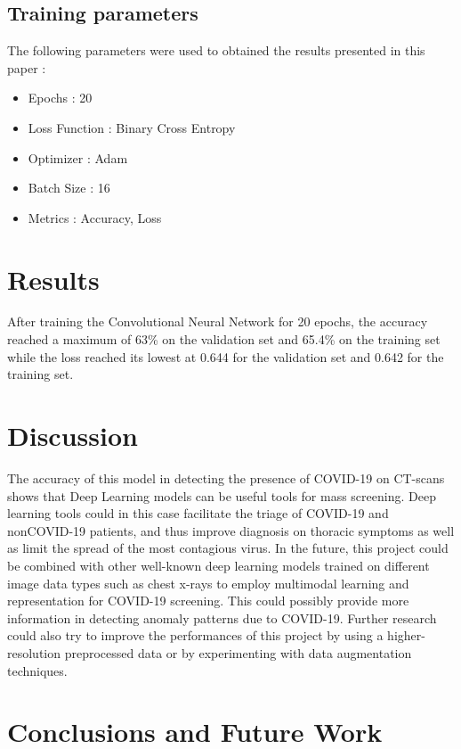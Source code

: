 \documentclass[12pt, letterpaper]{article}
\begin{document}
\subsection{Training parameters}
The following parameters were used to obtained the results presented in this paper :
\begin{itemize}
    \item Epochs : 20
    \item Loss Function : Binary Cross Entropy
    \item Optimizer : Adam
    \item Batch Size : 16
    \item Metrics : Accuracy, Loss
\end{itemize}

\newpage
\section{Results}
After training the Convolutional Neural Network for 20 epochs, the accuracy reached a maximum of 63\% on the validation set and 65.4\% on the training set while the loss reached its lowest at 0.644 for the validation set and 0.642 for the training set. 

\newpage
\section{Discussion}
The accuracy of this model in detecting the presence of COVID-19 on CT-scans shows that Deep Learning models can be useful tools for mass screening. Deep learning tools could in this case facilitate the triage of COVID-19 and nonCOVID-19 patients, and thus improve diagnosis on thoracic symptoms as well as limit the spread of the most contagious virus. In the future, this project could be combined with other well-known deep learning models trained on different image data types such as chest x-rays to employ multimodal learning and representation for COVID-19 screening. This could possibly provide more information in detecting anomaly patterns due to COVID-19. Further research could also try to improve the performances of this project by using a higher-resolution preprocessed data or by experimenting with data augmentation techniques.

\newpage
\section{Conclusions and Future Work}


\newpage


\nocite{*}
\end{document}
